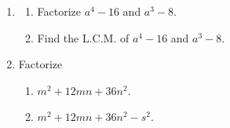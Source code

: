 \documentclass[11pt]{article}
\begin{document}
\begin{enumerate}
            \hrulefill
            
            \hrulefill

        \pagebreak
        \item \begin{enumerate}
            \item Factorize $a^4-16$ and $a^3-8$.
            \item Find the L.C.M. of $a^4-16$ and $a^3-8$.
        \end{enumerate}
        \hrulefill
            
            \hrulefill
            
            \hrulefill
            
            \hrulefill
            
            \hrulefill
            
            \hrulefill
            
            \hrulefill
            
            \hrulefill
            
            \hrulefill
            
            \hrulefill
            
            \hrulefill
            
            \hrulefill
            
            \hrulefill
            
            \hrulefill
            
        \item Factorize\begin{enumerate}
            \item $m^2+12mn+36n^2$.
            \item $m^2+12mn+36n^2-s^2$.
        \end{enumerate}
        \hrulefill
            
            \hrulefill
            
            \hrulefill
            
            \hrulefill
            
            \hrulefill
            
            \hrulefill
            
            \hrulefill
            
            \hrulefill
            
            \hrulefill
            

\end{enumerate}
\end{document}
